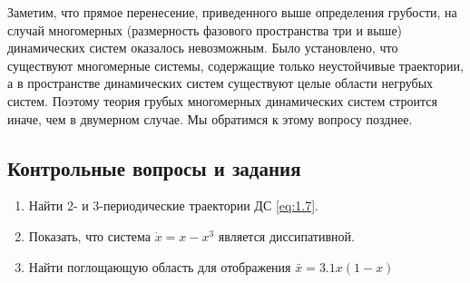Заметим, что прямое перенесение, приведенного выше определения
грубости, на случай многомерных (размерность фазового пространства три и выше) динамических систем оказалось невозможным. Было установлено, что существуют многомерные системы, содержащие только неустойчивые траектории, а в пространстве динамических систем существуют целые области
негрубых систем. Поэтому теория грубых многомерных динамических систем строится иначе, чем в двумерном случае. Мы обратимся к этому вопросу позднее.

\subsection{Контрольные вопросы и задания} %
\begin{enumerate}
	\item Найти 2- и 3-периодические траектории ДС \eqref{eq:1.7}.
	\item Показать, что система $\dot x = x- x^3$ является диссипативной.
	\item Найти поглощающую область для отображения $\bar x= 3.1x(1-x)$
\end{enumerate}
